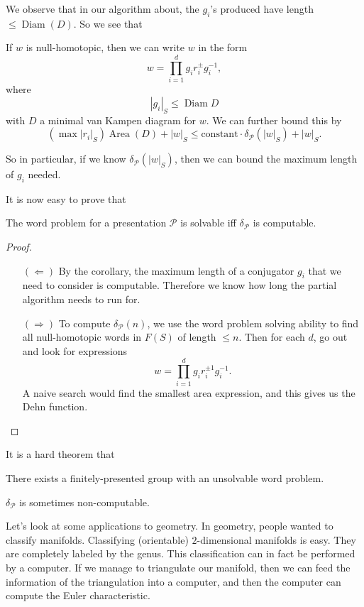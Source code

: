 \documentclass[a4paper]{article}
\DeclareMathOperator\Area{Area}
\DeclareMathOperator\Diam{Diam}
\begin{document}
We observe that in our algorithm about, the $g_i$'s produced have length $\leq \Diam(D)$. So we see that
\begin{cor}
  If $w$ is null-homotopic, then we can write $w$ in the form
  \[
    w = \prod_{i = 1}^d g_i r_i^{\pm} g_i^{-1},
  \]
  where
  \[
    |g_i|_S \leq \Diam D
  \]
  with $D$ a minimal van Kampen diagram for $w$. We can further bound this by
  \[
    (\max |r_i|_S) \Area(D) + |w|_S \leq \text{constant} \cdot \delta_{\mathcal{P}}(|w|_S) + |w|_S.
  \]
\end{cor}
So in particular, if we know $\delta_{\mathcal{P}}(|w|_S)$, then we can bound the maximum length of $g_i$ needed.

It is now easy to prove that
\begin{prop}
  The word problem for a presentation $\mathcal{P}$ is solvable iff $\delta_{\mathcal{P}}$ is computable.
\end{prop}

\begin{proof}\leavevmode
  \begin{itemize}
    \item[$(\Leftarrow)$] By the corollary, the maximum length of a conjugator $g_i$ that we need to consider is computable. Therefore we know how long the partial algorithm needs to run for.
    \item[$(\Rightarrow)$] To compute $\delta_{\mathcal{P}}(n)$, we use the word problem solving ability to find all null-homotopic words in $F(S)$ of length $\leq n$. Then for each $d$, go out and look for expressions
      \[
        w = \prod_{i = 1}^d g_i r_i^{\pm 1} g_i^{-1}.
      \]
      A naive search would find the smallest area expression, and this gives us the Dehn function.\qedhere
  \end{itemize}
\end{proof}

It is a hard theorem that
\begin{thm}
  There exists a finitely-presented group with an unsolvable word problem.
\end{thm}

\begin{cor}
  $\delta_{\mathcal{P}}$ is sometimes non-computable.
\end{cor}

Let's look at some applications to geometry. In geometry, people wanted to classify manifolds. Classifying (orientable) $2$-dimensional manifolds is easy. They are completely labeled by the genus. This classification can in fact be performed by a computer. If we manage to triangulate our manifold, then we can feed the information of the triangulation into a computer, and then the computer can compute the Euler characteristic.
\end{document}
